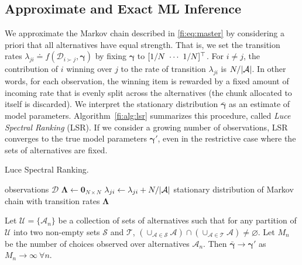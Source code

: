 \subsection{Approximate and Exact ML Inference}

We approximate the Markov chain described in \eqref{fi:eq:master} by considering a priori that all alternatives have equal strength.
That is, we set the transition rates $\lambda_{ji} \doteq f(\mathcal{D}_{i \succ j}, \bm{\gamma})$ by fixing $\bm{\gamma}$ to $[1/N \  \cdots \  1/N]^\top$.
For $i \ne j$, the contribution of $i$ winning over $j$ to the rate of transition $\lambda_{ji}$ is $N / \lvert\mathcal{A}\rvert$.
In other words, for each observation, the winning item is rewarded by a fixed amount of incoming rate that is evenly split across the alternatives (the chunk allocated to itself is discarded).
We interpret the stationary distribution $\bar{\bm{\gamma}}$ as an estimate of model parameters.
Algorithm~\ref{fi:alg:lsr} summarizes this procedure, called \emph{Luce Spectral Ranking} (LSR).
If we consider a growing number of observations, LSR converges to the true model parameters $\bm{\gamma}'$, even in the restrictive case where the sets of alternatives are fixed.

\begin{algorithm}[t]
  \caption{Luce Spectral Ranking.}
  \label{fi:alg:lsr}
  \begin{algorithmic}[1]
    \Require observations $\mathcal{D}$
    \State $\bm{\Lambda} \gets \bm{0}_{N \times N}$
        \State $\lambda_{ji} \gets \lambda_{ji} + N / \lvert\mathcal{A}\rvert$
      \EndFor
    \EndFor
    \State \Return stationary distribution of Markov chain with transition rates $\bm{\Lambda}$
  \end{algorithmic}
\end{algorithm}

\begin{theorem}
\label{fi:thm:consistency}
Let $\mathcal{U} = \{ \mathcal{A}_n \}$ be a collection of sets of alternatives such that for any partition of $\mathcal{U}$ into two non-empty sets $\mathcal{S}$ and $\mathcal{T}$, $\left( \cup_{\mathcal{A} \in \mathcal{S}} \mathcal{A} \right) \cap \left( \cup_{\mathcal{A} \in \mathcal{T}} \mathcal{A} \right) \ne \varnothing$.
Let $M_n$ be the number of choices observed over alternatives $\mathcal{A}_n$.
Then $\bar{\bm{\gamma}} \to \bm{\gamma}'$ as $M_n \to \infty \ \forall n$.
\end{theorem}

